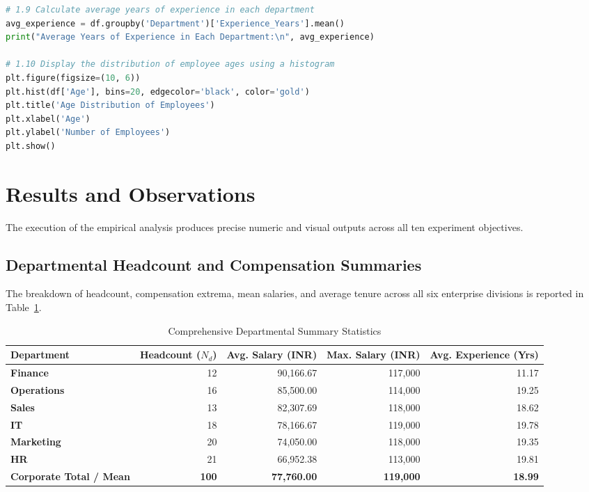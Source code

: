 \documentclass[12pt,a4paper]{report}
\begin{document}
\begin{lstlisting}[language=Python, caption={Experiment 1 Implementation from \texttt{experiment\_1.ipynb}}]
# 1.9 Calculate average years of experience in each department
avg_experience = df.groupby('Department')['Experience_Years'].mean()
print("Average Years of Experience in Each Department:\n", avg_experience)

# 1.10 Display the distribution of employee ages using a histogram
plt.figure(figsize=(10, 6))
plt.hist(df['Age'], bins=20, edgecolor='black', color='gold')
plt.title('Age Distribution of Employees')
plt.xlabel('Age')
plt.ylabel('Number of Employees')
plt.show()
\end{lstlisting}

\section{Results and Observations}
The execution of the empirical analysis produces precise numeric and visual outputs across all ten experiment objectives.

\subsection{Departmental Headcount and Compensation Summaries}
The breakdown of headcount, compensation extrema, mean salaries, and average tenure across all six enterprise divisions is reported in Table~\ref{tab:exp1_dept_summary}.
\begin{table}[H]
\centering
\small
\caption{Comprehensive Departmental Summary Statistics}
\label{tab:exp1_dept_summary}
\begin{tabular}{lrrrr}
\toprule
\textbf{Department} & \textbf{Headcount ($N_d$)} & \textbf{Avg. Salary (INR)} & \textbf{Max. Salary (INR)} & \textbf{Avg. Experience (Yrs)} \\
\midrule
\textbf{Finance} & 12 & 90,166.67 & 117,000 & 11.17 \\
\textbf{Operations} & 16 & 85,500.00 & 114,000 & 19.25 \\
\textbf{Sales} & 13 & 82,307.69 & 118,000 & 18.62 \\
\textbf{IT} & 18 & 78,166.67 & 119,000 & 19.78 \\
\textbf{Marketing} & 20 & 74,050.00 & 118,000 & 19.35 \\
\textbf{HR} & 21 & 66,952.38 & 113,000 & 19.81 \\
\midrule
\textbf{Corporate Total / Mean} & \textbf{100} & \textbf{77,760.00} & \textbf{119,000} & \textbf{18.99} \\
\bottomrule
\end{tabular}
\end{table}
\end{document}
